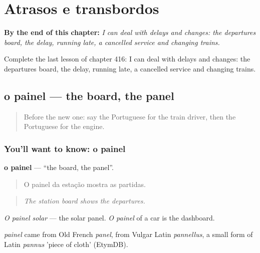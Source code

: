 
\chapter{Atrasos e transbordos}
\label{ch:pt-atrasos-e-transbordos}

\begin{chapteropening}
\textbf{By the end of this chapter:} \emph{I can deal with delays and changes: the departures board, the delay, running late, a cancelled service and changing trains.}

Complete the last lesson of chapter 416: I can deal with delays and changes: the departures board, the delay, running late, a cancelled service and changing trains.
\end{chapteropening}

\section[o painel]{o painel — the board, the panel}

\label{lesson:PT-C416-painel}



\begin{quote}
Before the new one: say the Portuguese for the train driver, then the Portuguese for the engine.
\end{quote}

\subsection*{You'll want to know: o painel}
\textbf{o painel} — \textquotedblleft{}the board, the panel\textquotedblright{}.

\begin{quote}
O painel da estação mostra as partidas.
\end{quote}

\begin{quote}
\emph{The station board shows the departures.}
\end{quote}

\emph{O painel solar} — the solar panel. \emph{O painel} of a car is the dashboard.

\begin{cousinweb}
\emph{painel} came from Old French \emph{panel}, from Vulgar Latin \emph{pannellus}, a small form of Latin \emph{pannus} 'piece of cloth' (EtymDB).
\end{cousinweb}

